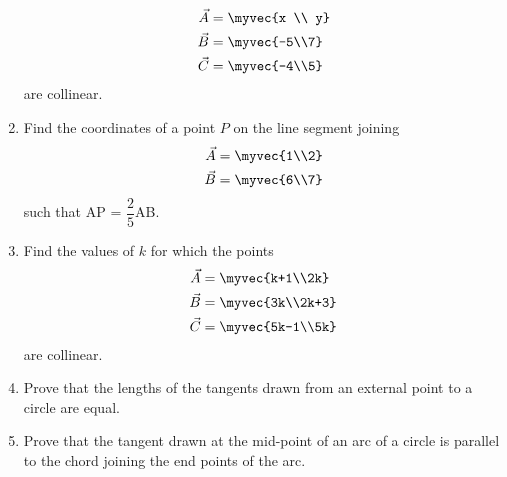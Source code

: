 \begin{enumerate}
\begin{align*}
\vec{A}&=\myvec{x \\ y}\\ 
\vec{B}&=\myvec{-5\\7}\\
\vec{C}&=\myvec{-4\\5} 
\end{align*}
are collinear.
\item Find the coordinates of a point $P$ on the line segment joining
\begin{align*}
\vec{A} &= \myvec{1\\2}\\
\vec{B} &= \myvec{6\\7}
\end{align*}
such that AP = $\dfrac{2}{5}$AB.
\item Find the values of $k$ for which the points
\begin{align*}
\vec{A} &= \myvec{k+1\\2k}\\
\vec{B} &= \myvec{3k\\2k+3}\\
\vec{C} &= \myvec{5k-1\\5k}
\end{align*}
are collinear.
\item Prove that the lengths of the tangents drawn from an external point to a circle are equal.
\item Prove that the tangent drawn at the mid-point of an arc of a circle is parallel to the chord joining the end points of the arc.

\end{enumerate}

